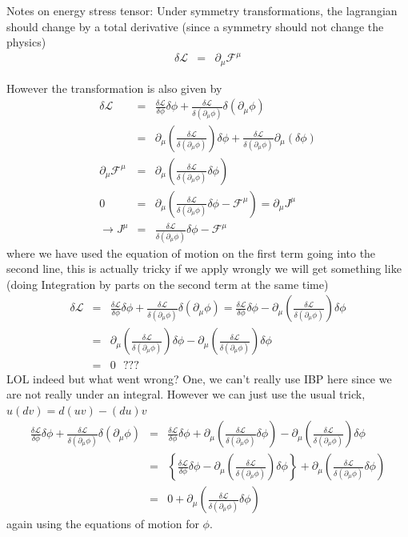 \documentclass[aps,preprint,preprintnumbers,nofootinbib,showpacs,prd]{revtex4-1}
\newcommand{\nbea}{\begin{eqnarray*}}
\newcommand{\neea}{\end{eqnarray*}}
\begin{document}
Notes on energy stress tensor:
Under symmetry transformations, the lagrangian should change by a total derivative (since a symmetry should not change the physics)
\nbea
\delta\mathcal{L} & = & \partial_\mu \mathcal{F}^\mu
\neea 

However the transformation is also given by
\nbea
\delta\mathcal{L} & = & \frac{\delta \mathcal{L}}{\delta\phi}\delta \phi + \frac{\delta \mathcal{L}}{\delta(\partial_\mu \phi)} \delta(\partial_\mu \phi) \\
& = & \partial_\mu \left ( \frac{\delta \mathcal{L}}{\delta(\partial_\mu \phi)} \right ) \delta \phi + \frac{\delta \mathcal{L}}{\delta(\partial_\mu \phi)} \partial_\mu(\delta\phi) \\
\partial_\mu \mathcal{F}^\mu & = & \partial_\mu \left ( \frac{\delta \mathcal{L}}{\delta(\partial_\mu \phi)} \delta \phi \right ) \\
0 & = & \partial_\mu \left ( \frac{\delta \mathcal{L}}{\delta(\partial_\mu \phi)} \delta \phi - \mathcal{F}^\mu \right ) = \partial_\mu J^\mu \\
\rightarrow J^\mu & = & \frac{\delta \mathcal{L}}{\delta(\partial_\mu \phi)} \delta \phi - \mathcal{F}^\mu
\neea
where we have used the equation of motion on the first term going into the second line, this is actually tricky if we apply wrongly we will get something like (doing Integration by parts on the second term at the same time)
\nbea
\delta\mathcal{L} & = & \frac{\delta \mathcal{L}}{\delta\phi}\delta \phi + \frac{\delta \mathcal{L}}{\delta(\partial_\mu \phi)} \delta(\partial_\mu \phi) = \frac{\delta \mathcal{L}}{\delta\phi}\delta \phi - \partial_\mu \left ( \frac{\delta \mathcal{L}}{\delta(\partial_\mu \phi)} \right ) \delta \phi \\
& = & \partial_\mu \left ( \frac{\delta \mathcal{L}}{\delta(\partial_\mu \phi)} \right ) \delta \phi  - \partial_\mu \left ( \frac{\delta \mathcal{L}}{\delta(\partial_\mu \phi)} \right ) \delta \phi \\
& = & 0 ~~~ ???
\neea
LOL indeed but what went wrong? One, we can't really use IBP here since we are not really under an integral. However we can just use the usual trick, $u(dv) = d(uv) - (du)v$
\nbea
\frac{\delta \mathcal{L}}{\delta\phi}\delta \phi + \frac{\delta \mathcal{L}}{\delta(\partial_\mu \phi)} \delta(\partial_\mu \phi) & = & \frac{\delta \mathcal{L}}{\delta\phi}\delta \phi + \partial_\mu \left ( \frac{\delta \mathcal{L}}{\delta(\partial_\mu \phi)} \delta \phi \right ) - \partial_\mu \left ( \frac{\delta \mathcal{L}}{\delta(\partial_\mu \phi)} \right ) \delta \phi \\
& = & \left \{ \frac{\delta \mathcal{L}}{\delta\phi}\delta \phi - \partial_\mu \left ( \frac{\delta \mathcal{L}}{\delta(\partial_\mu \phi)} \right ) \delta \phi \right \} + \partial_\mu \left ( \frac{\delta \mathcal{L}}{\delta(\partial_\mu \phi)} \delta \phi \right ) \\
& = & 0 + \partial_\mu \left ( \frac{\delta \mathcal{L}}{\delta(\partial_\mu \phi)} \delta \phi \right )
\neea
again using the equations of motion for $\phi$.
\end{document}
